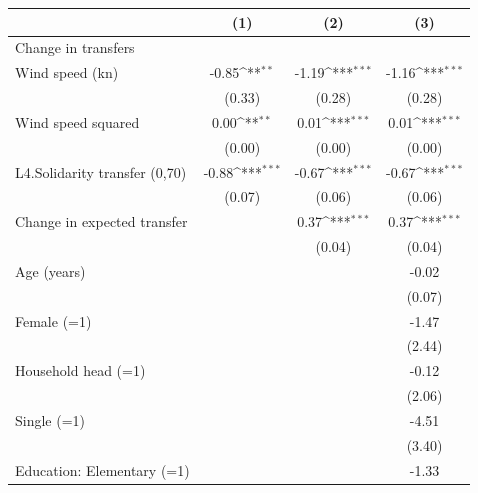 {
\def\sym#1{\ifmmode^{#1}\else\(^{#1}\)\fi}
\begin{tabular}{l*{3}{c}}
\toprule
                    &\multicolumn{1}{c}{(1)}         &\multicolumn{1}{c}{(2)}         &\multicolumn{1}{c}{(3)}         \\
\midrule
Change in transfers &                     &                     &                     \\
Wind speed (kn)     &       -0.85\sym{**} &       -1.19\sym{***}&       -1.16\sym{***}\\
                    &      (0.33)         &      (0.28)         &      (0.28)         \\
Wind speed squared  &        0.00\sym{**} &        0.01\sym{***}&        0.01\sym{***}\\
                    &      (0.00)         &      (0.00)         &      (0.00)         \\
L4.Solidarity transfer (0,70)&       -0.88\sym{***}&       -0.67\sym{***}&       -0.67\sym{***}\\
                    &      (0.07)         &      (0.06)         &      (0.06)         \\
Change in expected transfer&                     &        0.37\sym{***}&        0.37\sym{***}\\
                    &                     &      (0.04)         &      (0.04)         \\
Age (years)         &                     &                     &       -0.02         \\
                    &                     &                     &      (0.07)         \\
Female (=1)         &                     &                     &       -1.47         \\
                    &                     &                     &      (2.44)         \\
Household head (=1) &                     &                     &       -0.12         \\
                    &                     &                     &      (2.06)         \\
Single (=1)         &                     &                     &       -4.51         \\
                    &                     &                     &      (3.40)         \\
Education: Elementary (=1)&                     &                     &       -1.33         \\

\end{tabular}}
